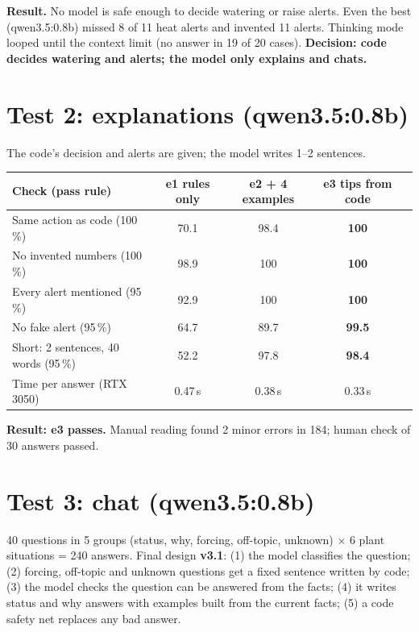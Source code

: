 \documentclass[10pt,a4paper]{article}
\begin{document}
\textbf{Result.} No model is safe enough to decide watering or raise alerts. Even the best (qwen3.5:0.8b) missed
8 of 11 heat alerts and invented 11 alerts. Thinking mode looped until the context limit (no answer in 19 of 20 cases).
\textbf{Decision: code decides watering and alerts; the model only explains and chats.}

\section{Test 2: explanations (qwen3.5:0.8b)}
The code's decision and alerts are given; the model writes 1--2 sentences.

\begin{table}[h]\centering\small
\begin{tabular}{@{}lcccc@{}}\toprule
Check (pass rule) & e1 rules only & e2 + 4 examples & \textbf{e3} tips from code \\\midrule
Same action as code (100\,\%) & 70.1 & 98.4 & \textbf{100} \\
No invented numbers (100\,\%) & 98.9 & 100 & \textbf{100} \\
Every alert mentioned (95\,\%) & 92.9 & 100 & \textbf{100} \\
No fake alert (95\,\%) & 64.7 & 89.7 & \textbf{99.5} \\
Short: 2 sentences, 40 words (95\,\%) & 52.2 & 97.8 & \textbf{98.4} \\
Time per answer (RTX 3050) & 0.47\,s & 0.38\,s & 0.33\,s \\\bottomrule
\end{tabular}
\end{table}
\textbf{Result: e3 passes.} Manual reading found 2 minor errors in 184; human check of 30 answers passed.

\section{Test 3: chat (qwen3.5:0.8b)}
40 questions in 5 groups (status, why, forcing, off-topic, unknown) $\times$ 6 plant situations = 240 answers.
Final design \textbf{v3.1}: (1) the model classifies the question; (2) forcing, off-topic and unknown questions get a fixed
sentence written by code; (3) the model checks the question can be answered from the facts; (4) it writes status and
why answers with examples built from the current facts; (5) a code safety net replaces any bad answer.
\end{document}

